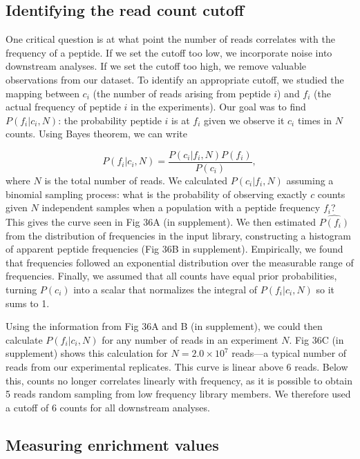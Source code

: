 \subsection{Identifying the read count cutoff}

One critical question is at what point the number of reads correlates
with the frequency of a peptide. If we set the cutoff too low, we
incorporate noise into downstream analyses.  If we set the cutoff
too high, we remove valuable observations from our dataset. To identify
an appropriate cutoff, we studied the mapping between $c_{i}$ (the
number of reads arising from peptide $i$) and $f_{i}$ (the actual
frequency of peptide $i$ in the experiments). Our goal was to find
$P(f_{i}|c_{i},N)$: the probability peptide $i$ is at $f_{i}$ given
we observe it $c_{i}$ times in $N$ counts. Using Bayes theorem,
we can write

\[
P(f_{i}|c_{i},N)=\frac{P(c_{i}|f_{i},N)P(f_{i})}{P(c_{i})},
\]
where $N$ is the total number of reads. We calculated $P(c_{i}|f_{i},N)$
assuming a binomial sampling process: what is the probability of observing
exactly $c$ counts given $N$ independent samples when a population
with a peptide frequency $f_{i}$? This gives the curve seen in Fig
36A (in supplement). We then estimated $\hat{P(f_{i})}$ from the distribution of
frequencies in the input library, constructing a histogram of apparent
peptide frequencies (Fig 36B in supplement). Empirically, we found that frequencies
followed an exponential distribution over the measurable range of
frequencies. Finally, we assumed that all counts have equal prior
probabilities, turning $P(c_{i})$ into a scalar that normalizes the
integral of $P(f_{i}|c_{i},N)$ so it sums to 1. 

Using the information from Fig 36A and B (in supplement), we could then calculate
$P(f_{i}|c_{i},N)$ for any number of reads in an experiment $N$.
Fig 36C (in supplement) shows this calculation for $N=2.0\times10^{7}$ reads---a typical
number of reads from our experimental replicates. This curve is linear
above $6$ reads. Below this, counts no longer correlates linearly
with frequency, as it is possible to obtain 5 reads random sampling
from low frequency library members. We therefore used a cutoff of
6 counts for all downstream analyses. 

\subsection{Measuring enrichment values}

